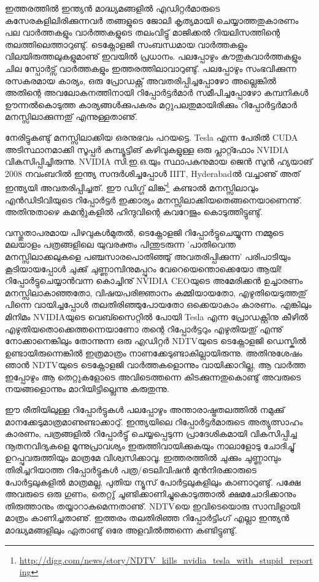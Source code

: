 ഇത്തരത്തില്‍ ഇന്ത്യന്‍ മാദ്ധ്യമങ്ങളില്‍ എഡിറ്റര്‍മാരുടെ കസേരകളിലിരിക്കുന്നവര്‍ തങ്ങളുടെ ജോലി കൃത്യമായി 
ചെയ്യാത്തതുകാരണം പല വാര്‍ത്തകളും വാര്‍ത്തകളുടെ തലംവിട്ടു് മാജിക്കല്‍ റിയലിസത്തിന്റെ തലത്തിലെത്താറുണ്ടു്. 
ടെക്നോളജി സംബന്ധമായ വാര്‍ത്തകളും വിലയിരുത്തലുകളുമാണു് ഇവയില്‍ പ്രധാനം. പലപ്പോഴും കൗതുകവാര്‍ത്തകളും 
ചില സ്പോര്‍ട്സ് വാര്‍ത്തകളും ഇത്തരത്തിലാവാറുണ്ടു്. പലപ്പോഴും സംഭവിക്കുന്ന രസകരമായ കാര്യം,  
ഒരു പ്രോഡക്റ്റ് അവതരിപ്പിച്ചപ്പോഴോ അല്ലെങ്കില്‍ അതിന്റെ അവലോകനത്തിനായി 
റിപ്പോര്‍ട്ടര്‍മാര്‍ സമീപിച്ചപ്പോഴോ കമ്പനികള്‍ ഊന്നല്‍കൊടുത്ത കാര്യങ്ങള്‍ക്കുപകരം മറ്റുപലതുമായിരിക്കും 
റിപ്പോര്‍ട്ടര്‍മാര്‍ മനസ്സിലാക്കുന്നതു് എന്നുള്ളതാണു്.

നേരിട്ടുകണ്ടു് മനസ്സിലാക്കിയ ഒരനുഭവം പറയട്ടെ.  Tesla എന്ന പേരില്‍ CUDA അടിസ്ഥാനമാക്കി 
സൂപ്പര്‍ കമ്പ്യൂട്ടിങ് കഴിവുകളുള്ള ഒരു പ്ലാറ്റ്ഫോം NVIDIA വികസിപ്പിച്ചിരുന്നു. NVIDIA സി.ഇ.ഒ.യും സ്ഥാപകനുമായ ജെന്‍ സുന്‍ 
ഹ്യയാങ് 2008 നവംബറില്‍ ഇന്ത്യ സന്ദര്‍ശിച്ചപ്പോള്‍ IIIT, Hyderabadല്‍ വച്ചാണു് അത് ഇന്ത്യയി 
അവതരിപ്പിച്ചത്. ഈ ഡിഗ്ഗ് 
ലിങ്ക്\footnote{\url{http://digg.com/news/story/NDTV_kills_nvidia_tesla_with_stupid_reporting}}
കണ്ടാല്‍ മനസ്സിലാവും എന്‍ഡിടിവിയുടെ റിപ്പോര്‍ട്ടര്‍ ഇക്കാര്യം 
മനസ്സിലാക്കിയതെങ്ങനെയാണെന്നു്. അതിനുതാഴെ കമന്റുകളില്‍ ഹിന്ദുവിന്റെ കവറേജും കൊടുത്തിട്ടുണ്ടു്.

വസ്തുതാപരമായ പിഴവുകള്‍മുതല്‍, ടെക്നോളജി റിപ്പോര്‍ട്ടുചെയ്യുന്ന നമ്മുടെ മലയാളം പത്രങ്ങളിലെ യുവരക്തം 
പിന്തുടരുന്ന 'പാതിവെന്ത മനസ്സിലാക്കലുകളെ പഞ്ചസാരപൊതിഞ്ഞു് അവതരിപ്പിക്കുന്ന' പരിപാടിയും കൂടിയായപ്പോള്‍ 
ചുക്കു് ചുണ്ണാമ്പിനുമപ്പുറം വേറെയെന്തൊക്കെയോ ആയി! റിപ്പോര്‍ട്ടുചെയ്യാന്‍വന്ന കൊച്ചിനു് NVIDIA CEOയുടെ 
അമേരിക്കന്‍ ഉച്ചാരണം മനസ്സിലാകാഞ്ഞതോ, വിഷയപരിജ്ഞാനം കമ്മിയായതോ, എഴുതിയെടുത്തതു് പിന്നെ 
വായിച്ചപ്പോള്‍ തലതിരിഞ്ഞുപോയതോ ഒക്കെയാകാം കാരണം. എങ്കിലും മിനിമം NVIDIAയുടെ വെബ്സൈറ്റില്‍ പോയി Tesla 
എന്ന പ്രോഡക്റ്റിനു കീഴില്‍ എഴുതിയതൊക്കെത്തന്നെയാണോ തന്റെ റിപ്പോര്‍ട്ടറും എഴുതിയതു് എന്നു് നോക്കാനെങ്കിലും 
തോന്നുന്ന ഒരു എഡിറ്റര്‍ NDTVയുടെ ടെക്നോളജി ഡെസ്കില്‍ ഉണ്ടായിരുന്നെങ്കില്‍ ഇത്രമാത്രം 
നാണക്കേടുണ്ടാകില്ലായിരുന്നു. അതിനുശേഷം ഞാന്‍ NDTVയുടെ ടെക്നോളജി വാര്‍ത്തകളൊന്നും വായിക്കാറില്ല, 
ആ വാര്‍ത്ത ഇപ്പോഴും ആ തെറ്റുകളോടെ അവിടെത്തന്നെ കിടക്കുന്നതുകൊണ്ടു് അവരുടെ നയങ്ങളൊന്നും 
മാറിയിട്ടില്ലെന്നു കരുതുന്നു.

ഈ രീതിയിലുള്ള റിപ്പോര്‍ട്ടുകള്‍ പലപ്പോഴും അന്താരാഷ്ട്രതലത്തില്‍ നമുക്കു് മാനക്കേടുമാത്രമാണുണ്ടാക്കാറു്. ഇന്ത്യയിലെ 
റിപ്പോര്‍ട്ടര്‍മാരുടെ അത്യുത്സാഹം കാരണം, പത്രങ്ങളില്‍ റിപ്പോര്‍ട്ടു് ചെയ്യപ്പെടുന്ന പ്രാദേശികമായി വികസിപ്പിച്ച നൂതനവിദ്യകളെ 
മൂന്നുപ്രാവശ്യം ഇരുത്തിവായിക്കുകയും നാലാളോടു ചോദിച്ചു് ഉറപ്പുവരുത്തിയും മാത്രമേ വിശ്വസിക്കാവൂ.
 ഇത്തരത്തില്‍ ചുക്കും ചുണ്ണാമ്പും തിരിച്ചറിയാത്ത റിപ്പോര്‍ട്ടുകള്‍ പത്ര/ടെലിവിഷന്‍ മുന്‍നിരക്കാരുടെ 
പോര്‍ട്ടലുകളില്‍ മാത്രമല്ല, പുതിയ ന്യൂസ് പോര്‍ട്ടലുകളിലും കാണാറുണ്ടു്. പക്ഷേ അവരുടെ ഒരു ഗുണം, തെറ്റു് 
ചൂണ്ടിക്കാണിച്ചുകൊടുത്താല്‍ ക്ഷമചോദിക്കാനും തിരുത്താനും തയ്യാറാകുമെന്നതാണു്. NDTVയെ ഇവിടെയൊരു 
സാമ്പിളായി മാത്രം കാണിച്ചതാണു്. ഇത്തരം തലതിരിഞ്ഞ റിപ്പോര്‍ട്ടിംഗ് എല്ലാ ഇന്ത്യന്‍ മാദ്ധ്യമങ്ങളിലും ഏതാണ്ടു് ഒരേ 
അളവില്‍ത്തന്നെ കണ്ടിട്ടുണ്ടു്.

